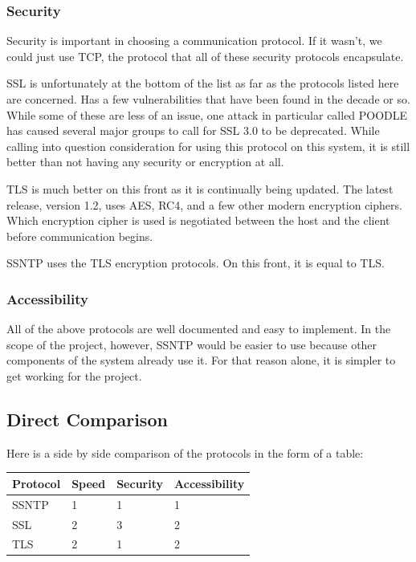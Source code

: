 \documentclass[10pt,letterpaper,onecolumn,draftclsnofoot]{IEEEtran}
\begin{document}
\subsubsection{Security}
Security is important in choosing a communication protocol. If it wasn't, we
could just use TCP, the protocol that all of these security protocols
encapsulate.

SSL is unfortunately at the bottom of the list as far as the
protocols listed here are concerned. Has a few vulnerabilities that have been
found in the decade or so. While some of these are less of an issue, one attack
in particular called POODLE has caused several major groups to call for SSL 3.0
to be deprecated.\cite{poodle} While calling into question consideration for
using this protocol on this system, it is still better than not having any
security or encryption at all.

TLS is much better on this front as it is continually being updated. The latest
release, version 1.2, uses AES, RC4, and a few other modern encryption ciphers.
\cite{tls} Which encryption cipher is used is negotiated between the host and
the client before communication begins.

SSNTP uses the TLS encryption protocols. On this front, it is equal to TLS.

\subsubsection{Accessibility}
All of the above protocols are well documented and easy to implement. In the
scope of the project, however, SSNTP would be easier to use because other
components of the system already use it. For that reason alone, it is simpler
to get working for the project.

\subsection{Direct Comparison}
Here is a side by side comparison of the protocols in the form of a table:

\begin{center}
	\begin{tabular}{| l | l | l | l |}
		\hline
		Protocol & Speed & Security & Accessibility \\ \hline
		SSNTP & 1 & 1 & 1 \\ \hline
		SSL & 2 & 3 & 2 \\ \hline
		TLS & 2 & 1 & 2 \\ \hline
	\end{tabular}
\end{center}
\end{document}
